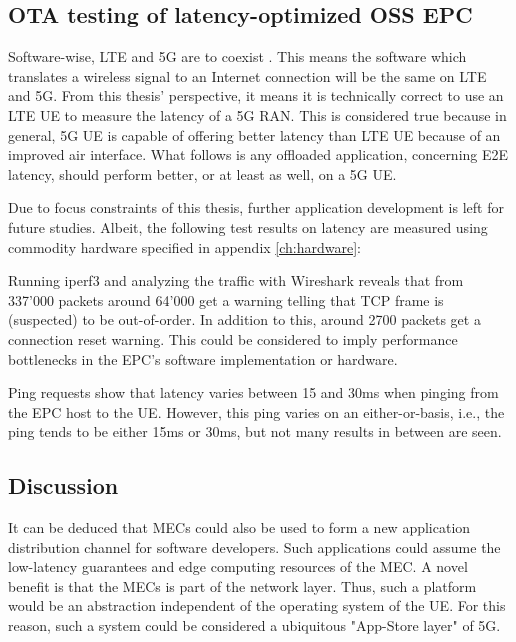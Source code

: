 \documentclass[12pt]{article}
\begin{document}
\subsection{OTA testing of latency-optimized OSS EPC}

Software-wise, \gls{LTE} and \gls{5G} are to coexist \cite{andrews2014will, larew2013air, pi2011introduction}. This means the software which translates a wireless signal to an Internet connection will be the same on \gls{LTE} and \gls{5G}. From this thesis' perspective, it means it is technically correct to use an \gls{LTE} \gls{UE} to measure the latency of a \gls{5G} \gls{RAN}. This is considered true because in general, \gls{5G} \gls{UE} is capable of offering better latency than \gls{LTE} \gls{UE} because of an improved air interface. What follows is any offloaded application, concerning \gls{E2E} latency, should perform better, or at least as well, on a \gls{5G} \gls{UE}.

Due to focus constraints of this thesis, further application development is left for future studies. Albeit, the following test results on latency are measured using commodity hardware specified in appendix \ref{ch:hardware}:

Running iperf3 and analyzing the traffic with Wireshark reveals that from 337'000 packets around 64'000 get a warning telling that \gls{TCP} frame is (suspected) to be out-of-order. In addition to this, around 2700 packets get a connection reset warning. This could be considered to imply performance bottlenecks in the \gls{EPC}'s software implementation or hardware.

Ping requests show that latency varies between 15 and 30ms when pinging from the \gls{EPC} host to the \gls{UE}. However, this ping varies on an either-or-basis, i.e., the ping tends to be either 15ms or 30ms, but not many results in between are seen.


\subsection{Discussion}

It can be deduced that \glspl{MEC} could also be used to form a new application distribution channel for software developers. Such applications could assume the low-latency guarantees and edge computing resources of the \gls{MEC}. A novel benefit is that the \glspl{MEC} is part of the network layer. Thus, such a platform would be an abstraction independent of the operating system of the \gls{UE}. For this reason, such a system could be considered a ubiquitous "App-Store layer" of \gls{5G}.
\end{document}
